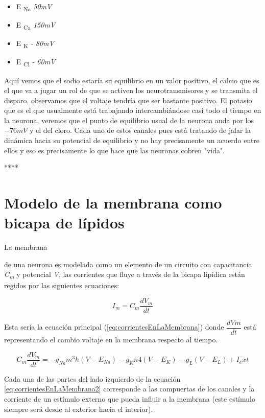 \begin{itemize}
\item E \textsubscript{Na}  \emph{50mV}
\item E \textsubscript{Ca}  \emph{150mV}
\item E \textsubscript{K}   \emph{- 80mV}
\item E \textsubscript{Cl}  \emph{- 60mV}
\end{itemize}
Aquí vemos que el sodio estaría su equilibrio en un valor positivo, 
el calcio que es el que va a jugar un rol de que se activen los neurotransmisores y se transmita el disparo, observamos que el voltaje tendría que ser bastante positivo. El potasio que es el que usualmente está trabajando intercambiándose casi todo el tiempo en la neurona, veremos que el punto de equilibrio usual de la neurona anda por los $-76 mV$ y el del cloro. Cada uno de estos canales pues está tratando de jalar la dinámica hacia su potencial de equilibrio y no hay precisamente un acuerdo entre ellos y eso es precisamente lo que hace que las neuronas cobren "vida".


****
\section{Modelo de la membrana como bicapa de lípidos}

\hypertarget{LaEq}{La membrana} de una neurona es modelada como un elemento de un circuito con capacitancia \emph{C\textsubscript{m}} y potencial \emph{V}, las corrientes que fluye a través de la bicapa lipídica están regidos por las siguientes ecuaciones:


\begin{equation}
  I_{m} = C_{m} \dfrac{dV_{m}}{dt}
  \label{eq:corrientesEnLaMembrana}
\end{equation}

Esta sería la ecuación principal (\ref{eq:corrientesEnLaMembrana}) donde \(\dfrac{dVm}{dt}\) está representando el cambio voltaje en la membrana respecto al tiempo.

\begin{equation}
  C_{m} \dfrac{dV_{m}}{dt} =  - g_{Na} m^3 h(V - E_{Na} ) - g_{K} n 4 (V - E_{K} ) - g_{L} (V - E_{L} ) + I_ext
  \label{eq:corrientesEnLaMembrana2}
\end{equation}

Cada una de las partes del lado izquierdo de la ecuación \ref{eq:corrientesEnLaMembrana2} corresponde a las compuertas de los canales y la corriente de un estímulo externo que pueda influir a la membrana (este estímulo siempre será desde al exterior hacia el interior).

